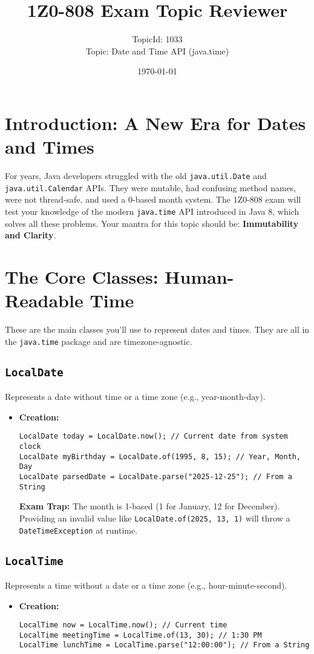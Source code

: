 \documentclass[12pt]{article}
\title{\textbf{1Z0-808 Exam Topic Reviewer}}
\author{TopicId: 1033 \\ Topic: Date and Time API (java.time)}
\date{\today}
\begin{document}
\maketitle
\newpage\begin{enumerate}[label=(\arabic*)]
\section*{Introduction: A New Era for Dates and Times}
For years, Java developers struggled with the old \texttt{java.util.Date} and \texttt{java.util.Calendar} APIs. They were mutable, had confusing method names, were not thread-safe, and used a 0-based month system. The 1Z0-808 exam will test your knowledge of the modern \texttt{java.time} API introduced in Java 8, which solves all these problems. Your mantra for this topic should be: \textbf{Immutability and Clarity}.

\section{The Core Classes: Human-Readable Time}
These are the main classes you'll use to represent dates and times. They are all in the \texttt{java.time} package and are timezone-agnostic.

\subsection{\texttt{LocalDate}}
Represents a date without time or a time zone (e.g., year-month-day).
\begin{itemize}
    \item \textbf{Creation:}
    \begin{verbatim}
LocalDate today = LocalDate.now(); // Current date from system clock
LocalDate myBirthday = LocalDate.of(1995, 8, 15); // Year, Month, Day
LocalDate parsedDate = LocalDate.parse("2025-12-25"); // From a String
    \end{verbatim}
    \textbf{Exam Trap:} The month is 1-based (1 for January, 12 for December). Providing an invalid value like \texttt{LocalDate.of(2025, 13, 1)} will throw a \texttt{DateTimeException} at runtime.
\end{itemize}

\subsection{\texttt{LocalTime}}
Represents a time without a date or a time zone (e.g., hour-minute-second).
\begin{itemize}
    \item \textbf{Creation:}
    \begin{verbatim}
LocalTime now = LocalTime.now(); // Current time
LocalTime meetingTime = LocalTime.of(13, 30); // 1:30 PM
LocalTime lunchTime = LocalTime.parse("12:00:00"); // From a String
    \end{verbatim}
\end{itemize}


\end{enumerate}
\end{document}

